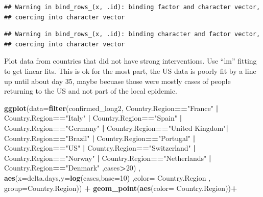 \documentclass[]{article}
\newenvironment{Shaded}{\begin{snugshade}}{\end{snugshade}}
\newcommand{\DataTypeTok}[1]{\textcolor[rgb]{0.13,0.29,0.53}{#1}}
\newcommand{\DecValTok}[1]{\textcolor[rgb]{0.00,0.00,0.81}{#1}}
\newcommand{\KeywordTok}[1]{\textcolor[rgb]{0.13,0.29,0.53}{\textbf{#1}}}
\newcommand{\NormalTok}[1]{#1}
\newcommand{\OperatorTok}[1]{\textcolor[rgb]{0.81,0.36,0.00}{\textbf{#1}}}
\newcommand{\StringTok}[1]{\textcolor[rgb]{0.31,0.60,0.02}{#1}}
\begin{document}
\begin{verbatim}
## Warning in bind_rows_(x, .id): binding factor and character vector,
## coercing into character vector
\end{verbatim}

\begin{verbatim}
## Warning in bind_rows_(x, .id): binding character and factor vector,
## coercing into character vector
\end{verbatim}

Plot data from countries that did not have strong interventions. Use
``lm'' fitting to get linear fits. This is ok for the most part, the US
data is poorly fit by a line up until about day 35, maybe becuase those
were mostly cases of people returning to the US and not part of the
local epidemic.

\begin{Shaded}
\begin{Highlighting}[]
\KeywordTok{ggplot}\NormalTok{(}\DataTypeTok{data=}\KeywordTok{filter}\NormalTok{(confirmed_long2,  Country.Region}\OperatorTok{==}\StringTok{"France"}  \OperatorTok{|}\StringTok{ }\NormalTok{Country.Region}\OperatorTok{==}\StringTok{"Italy"}  \OperatorTok{|}\StringTok{  }\NormalTok{Country.Region}\OperatorTok{==}\StringTok{"Spain"} \OperatorTok{|}\StringTok{ }\NormalTok{Country.Region}\OperatorTok{==}\StringTok{"Germany"} \OperatorTok{|}\StringTok{ }\NormalTok{Country.Region}\OperatorTok{==}\StringTok{"United Kingdom"}\OperatorTok{|}\StringTok{ }\NormalTok{Country.Region}\OperatorTok{==}\StringTok{"Brazil"} \OperatorTok{|}\StringTok{  }\NormalTok{Country.Region}\OperatorTok{==}\StringTok{"Portugal"} \OperatorTok{|}\StringTok{ }\NormalTok{Country.Region}\OperatorTok{==}\StringTok{"US"}  \OperatorTok{|}\StringTok{ }\NormalTok{Country.Region}\OperatorTok{==}\StringTok{"Switzerland"}  \OperatorTok{|}\StringTok{ }\NormalTok{Country.Region}\OperatorTok{==}\StringTok{"Norway"} \OperatorTok{|}\StringTok{ }\NormalTok{Country.Region}\OperatorTok{==}\StringTok{"Netherlands"}  \OperatorTok{|}\StringTok{ }\NormalTok{Country.Region}\OperatorTok{==}\StringTok{"Denmark"}\NormalTok{   ,cases}\OperatorTok{>}\DecValTok{20}\NormalTok{) , }\KeywordTok{aes}\NormalTok{(}\DataTypeTok{x=}\NormalTok{delta.days,}\DataTypeTok{y=}\KeywordTok{log}\NormalTok{(cases,}\DataTypeTok{base=}\DecValTok{10}\NormalTok{) ,}\DataTypeTok{color=}\NormalTok{ Country.Region , }\DataTypeTok{group=}\NormalTok{Country.Region)) }\OperatorTok{+}
\StringTok{  }\KeywordTok{geom_point}\NormalTok{(}\KeywordTok{aes}\NormalTok{(}\DataTypeTok{color=}\NormalTok{ Country.Region))}\OperatorTok{+}

\end{Highlighting}
\end{Shaded}
\end{document}
